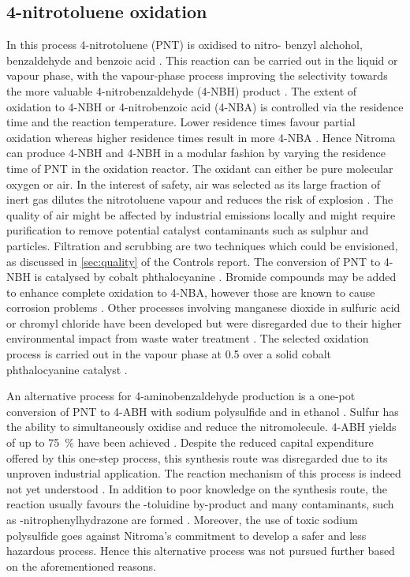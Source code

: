 \subsection{4-nitrotoluene oxidation}

In this process 4-nitrotoluene (PNT) is oxidised to nitro- benzyl alchohol, benzaldehyde and benzoic acid \cite{hoorn_modelling_2005}. This reaction can be carried out in the liquid or vapour phase, with the vapour-phase process improving the selectivity towards the more valuable 4-nitrobenzaldehyde (4-NBH) product \cite{bruhne_benzaldehyde_2011}. The extent of oxidation to 4-NBH or 4-nitrobenzoic acid (4-NBA) is controlled via the residence time and the reaction temperature. Lower residence times favour partial oxidation whereas higher residence times result in more 4-NBA \cite{bruhne_benzaldehyde_2011,tan_kinetic_2010}. Hence Nitroma can produce 4-NBH and 4-NBH in a modular fashion by varying the residence time of PNT in the oxidation reactor. The oxidant can either be pure molecular oxygen or air. In the interest of safety, air was selected as its large fraction of inert  gas dilutes the nitrotoluene vapour and reduces the risk of explosion \cite{bruhne_benzaldehyde_2011}. The quality of air might be affected by industrial emissions locally and might require purification to remove potential catalyst contaminants such as sulphur and particles. Filtration and scrubbing are two techniques which could be envisioned, as discussed in \cref{sec:quality} of the Controls report.  The conversion of PNT to 4-NBH is catalysed by cobalt phthalocyanine \cite{wendt_reaction_1986}. Bromide compounds may be added to enhance complete oxidation to 4-NBA, however those are known to cause corrosion problems \cite{opgrande_benzoic_2003}. Other processes involving manganese dioxide in sulfuric acid or chromyl chloride have been developed but were disregarded due to their higher environmental impact from waste water treatment \cite{bruhne_benzaldehyde_2011}. The selected oxidation process is carried out in the vapour phase at \SI{0.5}{\atm} over a solid cobalt phthalocyanine catalyst \cite{chandalia_kinetics_1999}. 

An alternative process for 4-aminobenzaldehyde production is a one-pot conversion of PNT to 4-ABH with sodium polysulfide and  in ethanol \cite{ogata_mechanism_1979}. Sulfur has the ability to simultaneously oxidise and reduce the nitromolecule. 4-ABH yields of up to \SI{75}{\percent} have been achieved \cite{beard_preparation_1944}. Despite the reduced capital expenditure offered by this one-step process, this synthesis route was disregarded due to its unproven industrial application. The reaction mechanism of this process is indeed not yet understood \cite{ogata_mechanism_1979}. In addition to poor knowledge on the synthesis route, the reaction usually favours the \para-toluidine by-product and many contaminants, such as \para-nitrophenylhydrazone are formed \cite{beard_preparation_1944}. Moreover, the use of toxic sodium polysulfide goes against Nitroma's commitment to develop a safer and less hazardous process. Hence this alternative process was not pursued further based on the aforementioned reasons.


